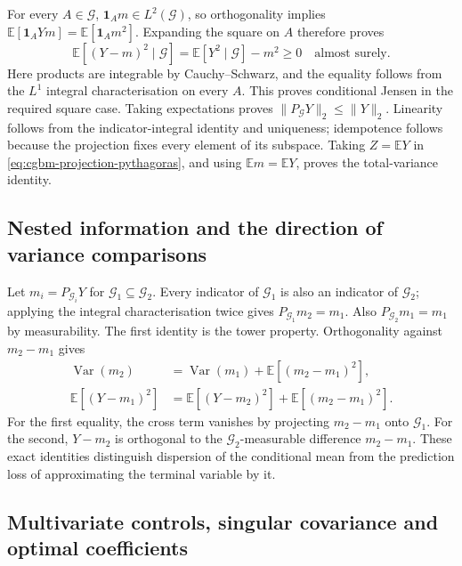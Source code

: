 \documentclass[11pt]{article}
\begin{document}
For every $A\in\mathcal G$, $\mathbf1_A m\in L^2(\mathcal G)$, so
orthogonality implies
$\mathbb E[\mathbf1_A Ym]=\mathbb E[\mathbf1_A m^2]$.
Expanding the square on $A$ therefore proves
\begin{equation}
 \mathbb E[(Y-m)^2\mid\mathcal G]
 =\mathbb E[Y^2\mid\mathcal G]-m^2\geq0
 \quad\text{almost surely}.
 \label{eq:cgbm-conditional-square}
\end{equation}
Here products are integrable by Cauchy--Schwarz, and the equality follows
from the $L^1$ integral characterisation on every $A$.
This proves conditional Jensen in the required square case. Taking
expectations proves $\|P_{\mathcal G}Y\|_2\leq\|Y\|_2$.
Linearity follows from the indicator-integral identity and uniqueness;
idempotence follows because the projection fixes every element of its
subspace. Taking $Z=\mathbb E Y$ in
\eqref{eq:cgbm-projection-pythagoras}, and using
$\mathbb E m=\mathbb E Y$, proves the total-variance identity.

\subsection{Nested information and the direction of variance comparisons}

Let $m_i=P_{\mathcal G_i}Y$ for
$\mathcal G_1\subseteq\mathcal G_2$. Every indicator of
$\mathcal G_1$ is also an indicator of $\mathcal G_2$; applying the
integral characterisation twice gives
$P_{\mathcal G_1}m_2=m_1$. Also
$P_{\mathcal G_2}m_1=m_1$ by measurability. The first identity is the
tower property. Orthogonality against $m_2-m_1$ gives
\begin{align}
 \operatorname{Var}(m_2)
 &=\operatorname{Var}(m_1)+\mathbb E[(m_2-m_1)^2],
 \label{eq:cgbm-nested-variance}\\
 \mathbb E[(Y-m_1)^2]
 &=\mathbb E[(Y-m_2)^2]+\mathbb E[(m_2-m_1)^2].
 \label{eq:cgbm-nested-loss}
\end{align}
For the first equality, the cross term vanishes by projecting
$m_2-m_1$ onto $\mathcal G_1$. For the second, $Y-m_2$ is orthogonal
to the $\mathcal G_2$-measurable difference $m_2-m_1$.
These exact identities distinguish dispersion of the conditional mean
from the prediction loss of approximating the terminal variable by it.

\subsection{Multivariate controls, singular covariance and optimal coefficients}
\end{document}
